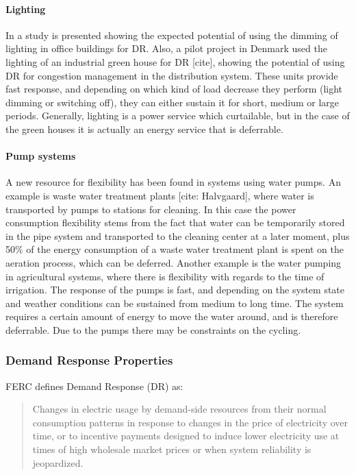 \paragraph{Lighting}
In \cite{rubinstein2011demand} a study is presented showing the expected potential of using the dimming of lighting in office buildings for DR. Also, a pilot project in Denmark used the lighting of an industrial green house for DR [cite], showing the potential of using DR for congestion management in the distribution system. These units provide fast response, and depending on which kind of load decrease they perform (light dimming or switching off), they can either sustain it for short, medium or large periods. Generally, lighting is a power service which curtailable, but in the case of the green houses it is actually an energy service that is deferrable.
\paragraph{Pump systems}
A new resource for flexibility has been found in systems using water pumps. An example is waste water treatment plants [cite: Halvgaard], where water is transported by pumps to stations for cleaning. In this case the power consumption flexibility stems from the fact that water can be temporarily stored in the pipe system and transported to the cleaning center at a later moment, plus 50\% of the energy consumption of a waste water treatment plant is spent on the aeration process, which can be deferred. Another example is the water pumping in agricultural systems, where there is flexibility with regards to the time of irrigation. The response of the pumps is fast, and depending on the system state and weather conditions can be sustained from medium to long time. The system requires a certain amount of energy to move the water around, and is therefore deferrable. Due to the pumps there may be constraints on the cycling.

\subsubsection{Demand Response Properties}
FERC defines Demand Response (DR) as:
\begin{quote}
	Changes in electric usage by demand-side resources from their normal consumption patterns in response to changes in the price of electricity over time, or to incentive payments designed to induce lower electricity use at times of high wholesale market prices or when system reliability is jeopardized\cite{fercdrdef}.
\end{quote}

